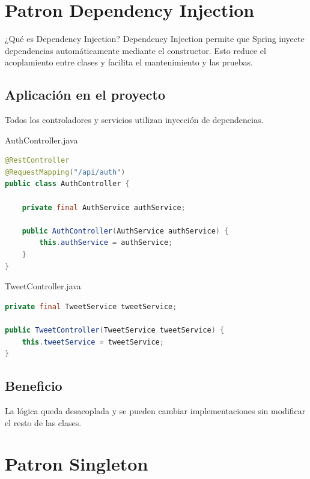 \documentclass[12pt,a4paper]{article}
\begin{document}
\section{Patron Dependency Injection}

\begin{patternbox}{¿Qué es Dependency Injection?}
Dependency Injection permite que Spring inyecte dependencias
automáticamente mediante el constructor. Esto reduce el acoplamiento
entre clases y facilita el mantenimiento y las pruebas.
\end{patternbox}

\subsection{Aplicación en el proyecto}

Todos los controladores y servicios utilizan inyección de dependencias.

\begin{filebox}{AuthController.java}
\begin{lstlisting}[language=Java]
@RestController
@RequestMapping("/api/auth")
public class AuthController {

    private final AuthService authService;

    public AuthController(AuthService authService) {
        this.authService = authService;
    }
}
\end{lstlisting}
\end{filebox}

\begin{filebox}{TweetController.java}
\begin{lstlisting}[language=Java]
private final TweetService tweetService;

public TweetController(TweetService tweetService) {
    this.tweetService = tweetService;
}
\end{lstlisting}
\end{filebox}

\subsection{Beneficio}
La lógica queda desacoplada y se pueden cambiar implementaciones sin modificar el resto de las clases.

\section{Patron Singleton}
\end{document}
